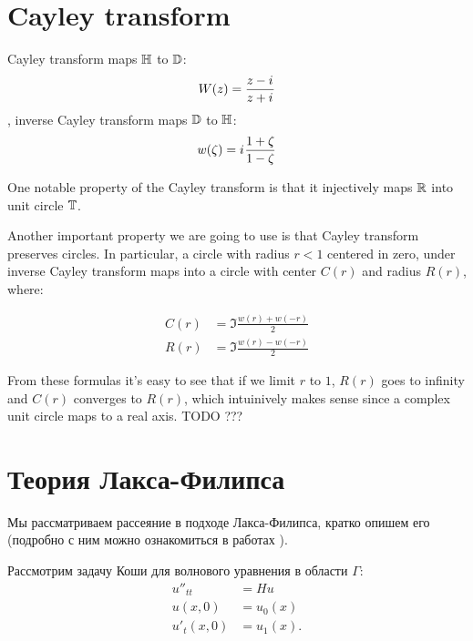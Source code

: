 \section{Cayley transform}

Cayley transform maps $\mathbb{H}$ to $\mathbb{D}$:
\begin{equation}\label{eq:cayley}
W(z) = \frac{z - \iu}{z + \iu}
\end{equation}
, inverse Cayley transform maps $\mathbb{D}$ to $\mathbb{H}$:
\begin{equation}\label{eq:cayley_inverse}
w(\zeta) = \iu \frac{1 + \zeta}{1 - \zeta}
\end{equation}

One notable property of the Cayley transform is that it injectively maps $\mathbb{R}$ into unit circle $\mathbb{T}$.

Another important property we are going to use is that Cayley transform preserves circles. In particular, a circle with radius $r < 1$ centered in zero, under inverse Cayley transform maps into a circle with center $C(r)$ and radius $R(r)$, where:

\begin{equation}\label{eq:c_and_r}
\begin{aligned}
   C(r) &= \Im \frac{w(r) + w(-r)}{2}
\\ R(r) &= \Im \frac{w(r) - w(-r)}{2}
\end{aligned}
\end{equation}

From these formulas it's easy to see that if we limit $r$ to $1$, $R(r)$ goes to infinity and $C(r)$ converges to $R(r)$, which intuinively makes sense since a complex unit circle maps to a real axis. TODO ???

\section{Теория Лакса-Филипса}
Мы рассматриваем рассеяние в подходе Лакса-Филипса, кратко опишем его (подробно с ним можно ознакомиться в работах \cite{lax1990scattering,lax1976scattering}).

Рассмотрим задачу Коши для волнового уравнения в области $\Gamma$:
\begin{equation}
\begin{aligned}
   u''_{tt}   &= H u
\\ u(x, 0)    &= u_0(x)
\\ u'_t(x, 0) &= u_1(x).
\end{aligned}
\end{equation}

